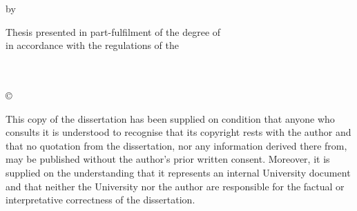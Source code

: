 \thispagestyle{empty}
\vskip 3cm
\begin{center}
    {\Huge\bfseries\sf \mytitle \par}
    \vskip 0.5cm
    \sf by
    \vskip 0.5cm
    \large \sf \authorname \\
    \sf \authornumber
\end{center}

\begin{center}
	\large \sf Thesis presented in part-fulfilment of the degree of \degname \\ in accordance with the regulations of the \univname
\end{center}

\vskip 3cm

\begin{minipage}{0.4\textwidth}
\begin{flushleft} 
\large \sf 
\depname \\
\univname \\
\univaddr
\vskip 0.5cm
\copyright~\mydate~\authorname
\end{flushleft}
\end{minipage}


\begin{minipage}{\textwidth}
\begin{flushleft}
\sf This copy of the dissertation has been supplied on condition that anyone who consults it is understood to recognise that its copyright rests with the author and that no quotation from the dissertation, nor any information derived there from, may be published without the author's prior written consent. Moreover, it is supplied on the understanding that it represents an internal University document and that neither the University nor the author are responsible for the factual or interpretative correctness of the dissertation.
\end{flushleft}
\end{minipage}

\vfill

\newpage